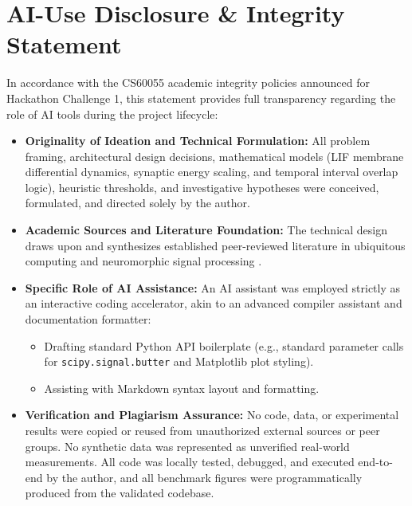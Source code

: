 \documentclass[11pt,a4paper]{article}
\begin{document}
\section{AI-Use Disclosure \& Integrity Statement}
In accordance with the CS60055 academic integrity policies announced for Hackathon Challenge 1, this statement provides full transparency regarding the role of AI tools during the project lifecycle:
\begin{itemize}
    \item \textbf{Originality of Ideation and Technical Formulation:} All problem framing, architectural design decisions, mathematical models (LIF membrane differential dynamics, synaptic energy scaling, and temporal interval overlap logic), heuristic thresholds, and investigative hypotheses were conceived, formulated, and directed solely by the author.
    \item \textbf{Academic Sources and Literature Foundation:} The technical design draws upon and synthesizes established peer-reviewed literature in ubiquitous computing and neuromorphic signal processing \cite{vaizman2017recognizing, maass1997networks, neftci2019surrogate, allen1983maintaining}.
    \item \textbf{Specific Role of AI Assistance:} An AI assistant was employed strictly as an interactive coding accelerator, akin to an advanced compiler assistant and documentation formatter:
    \begin{itemize}
        \item Drafting standard Python API boilerplate (e.g., standard parameter calls for \texttt{scipy.signal.butter} and Matplotlib plot styling).
        \item Assisting with Markdown syntax layout and formatting.
    \end{itemize}
    \item \textbf{Verification and Plagiarism Assurance:} No code, data, or experimental results were copied or reused from unauthorized external sources or peer groups. No synthetic data was represented as unverified real-world measurements. All code was locally tested, debugged, and executed end-to-end by the author, and all benchmark figures were programmatically produced from the validated codebase.
\end{itemize}
\end{document}
